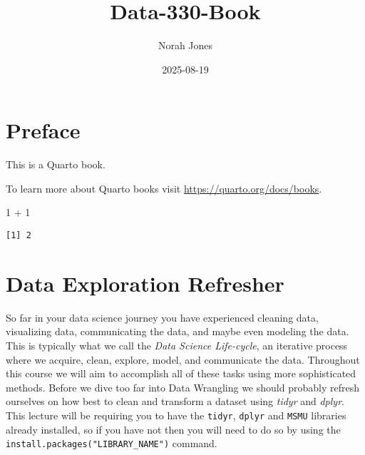 \documentclass[
  letterpaper,
  DIV=11,
  numbers=noendperiod]{scrreprt}
\title{Data-330-Book}
\author{Norah Jones}
\date{2025-08-19}
\newenvironment{Shaded}{\begin{snugshade}}{\end{snugshade}}
\newcommand{\DecValTok}[1]{\textcolor[rgb]{0.68,0.00,0.00}{#1}}
\newcommand{\SpecialCharTok}[1]{\textcolor[rgb]{0.37,0.37,0.37}{#1}}
\renewcommand*\contentsname{Table of contents}
\newcommand\contentsname{Table of contents}
\begin{document}
\maketitle

\renewcommand*\contentsname{Table of contents}
{
\hypersetup{linkcolor=}
\setcounter{tocdepth}{2}
\tableofcontents
}


\chapter*{Preface}\label{preface}


This is a Quarto book.

To learn more about Quarto books visit
\url{https://quarto.org/docs/books}.

\begin{Shaded}
\begin{Highlighting}[]
\DecValTok{1} \SpecialCharTok{+} \DecValTok{1}
\end{Highlighting}
\end{Shaded}

\begin{verbatim}
[1] 2
\end{verbatim}


\chapter{Data Exploration Refresher}\label{data-exploration-refresher}

So far in your data science journey you have experienced cleaning data,
visualizing data, communicating the data, and maybe even modeling the
data. This is typically what we call the
\textit{Data Science Life-cycle}, an iterative process where we acquire,
clean, explore, model, and communicate the data. Throughout this course
we will aim to accomplish all of these tasks using more sophisticated
methods. Before we dive too far into Data Wrangling we should probably
refresh ourselves on how best to clean and transform a dataset using
\textit{tidyr} and \textit{dplyr}. This lecture will be requiring you to
have the \texttt{tidyr}, \texttt{dplyr} and \texttt{MSMU} libraries
already installed, so if you have not then you will need to do so by
using the \texttt{install.packages("LIBRARY\_NAME")} command.
\end{document}
